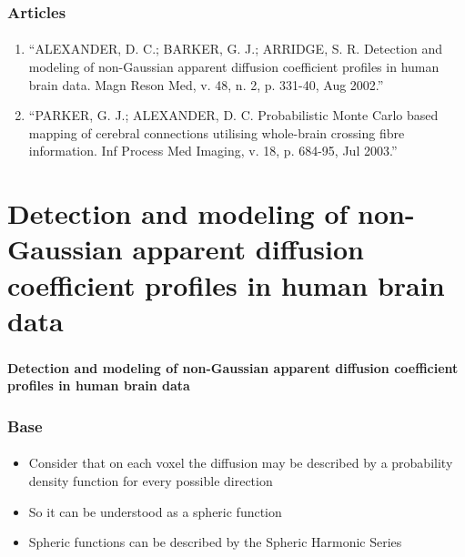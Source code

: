 \documentclass[10pt]{beamer}
\begin{document}
\begin{frame}
  \frametitle{Articles}
  \framesubtitle{}

  \begin{enumerate}
    \item ``ALEXANDER, D. C.; BARKER, G. J.; ARRIDGE, S. R. Detection and modeling of non-Gaussian apparent diffusion coefficient profiles in human brain data. Magn Reson Med, v. 48, n. 2, p. 331-40, Aug 2002.''
    \item ``PARKER, G. J.; ALEXANDER, D. C. Probabilistic Monte Carlo based mapping of cerebral connections utilising whole-brain crossing fibre information. Inf Process Med Imaging, v. 18, p. 684-95, Jul 2003.''
  \end{enumerate}
\end{frame}

\section{Detection and modeling of non-Gaussian apparent diffusion coefficient profiles in human brain data}
\begin{frame}
  \frametitle{}
  \framesubtitle{}

  \begin{Large}
  \begin{center}
  \textbf{Detection and modeling of non-Gaussian apparent diffusion coefficient profiles in human brain data}
  \end{center}
  \end{Large}
\end{frame}

\begin{frame}
  \frametitle{Base}
  \framesubtitle{}

  \begin{itemize}
    \item Consider that on each voxel the diffusion may be described by a probability density function for every possible direction
    \item So it can be understood as a spheric function
    \item Spheric functions can be described by the Spheric Harmonic Series
  \end{itemize}
\end{frame}
\end{document}
